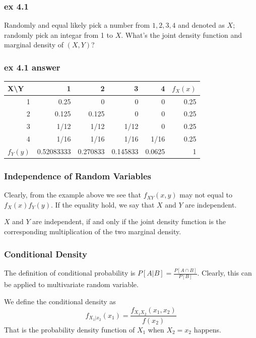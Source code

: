 \documentclass{beamer}
\begin{document}
\begin{frame}
    \frametitle{ex 4.1}
    Randomly and equal likely pick a number from $1,2,3,4$ and denoted as $X$; randomly pick an integar from 1 to $X$. What's the joint density function and marginal density of $(X, Y)$?

\end{frame}

\begin{frame}
    \frametitle{ex 4.1 answer}
    
\begin{table}[H]
    \centering
    
      \begin{tabular}{l|rrrr|r}
      X\textbackslash{}Y & 1     & 2     & 3     & 4     & \multicolumn{1}{l}{$f_X(x)$} \\
      \hline
      \multicolumn{1}{r|}{1} & 0.25  & 0     & 0     & 0     & 0.25 \\
      \multicolumn{1}{r|}{2} & 0.125 & 0.125 & 0     & 0     & 0.25 \\
      \multicolumn{1}{r|}{3} &   1/12 &   1/12 &   1/12 & 0     & 0.25 \\
      \multicolumn{1}{r|}{4} &   1/16 &   1/16 &   1/16 &   1/16 & 0.25 \\
      \hline
      $f_Y(y)$    & 0.52083333 & 0.270833 & 0.145833 & 0.0625 & 1 \\
      \end{tabular}%
    \label{tab:addlabel}%
  \end{table}%
  
\end{frame}

\begin{frame}
    \frametitle{Independence of Random Variables}
    Clearly, from the example above we see that $f_{XY}(x,y)$ may not equal to $f_X(x)f_{Y}(y)$. If the equality hold, we say that $X$ and $Y$ are independent.\par
    \vspace{0.3cm}
    $X$ and $Y$ are independent, if and only if the joint density function is the corresponding multiplication of the two marginal density.
    
\end{frame}



\begin{frame}
    \frametitle{Conditional Density}
    The definition of conditional probability is $P[A|B]=\frac{P[A\cap B]}{P[B]}$. Clearly, this can be applied to multivariate random variable.\par
    We define the conditional density as 
    \[f_{X_1|x_2}(x_1)=\frac{f_{X_1X_2}(x_1,x_2)}{f(x_2)}\]
    That is the probability density function of $X_1$ when $X_2=x_2$ happens.
    
\end{frame}
\end{document}
